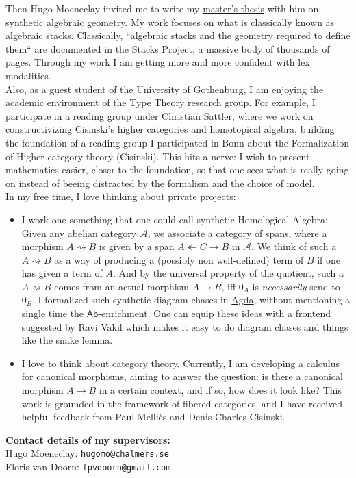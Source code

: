 \documentclass[12pt,headings=small,paper=A4,DIV=calc]{article}
\begin{document}
Then Hugo Moeneclay invited me to write my \href{https://github.com/timlichtnau/MasterThesis/blob/Main}{master's thesis} with him on synthetic algebraic geometry. My work focuses on what is classically known as algebraic stacks. Classically, ``algebraic stacks and the geometry required to define them`` are documented in the Stacks Project, a massive body of thousands of pages. Through my work I am getting more and more confident with lex modalities. \\
Also, as a guest student of the University of Gothenburg, I am enjoying the academic environment of the Type Theory research group. For example, I participate in a reading group under Christian Sattler, where we work on constructivizing Cisinski's higher categories and homotopical algebra, building the foundation of a reading group I participated in Bonn about the Formalization of Higher category theory (Cisinski). This hits a nerve: I wish to present mathematics easier, closer to the foundation, so that one sees what is really going on instead of beeing distracted by the formalism and the choice of model. \\
In my free time, I love thinking about private projects: 
\begin{itemize}
	\item I work one something that one could call synthetic Homological Algebra: Given any abelian category $\mathcal{A}$, we associate a category of spans, where a morphism $A \rightsquigarrow B$ is given by a span $A \twoheadleftarrow C \to B$ in $\mathcal{A}$. We think of such a $A \rightsquigarrow B$ as a way of producing a (possibly non well-defined) term of $B$ if one has given a term of $A$. And by the universal property of the quotient, such a $A \rightsquigarrow B$ comes from an actual morphism $A \to B$, iff $0_A$ is \emph{necessarily} send to $0_B$. I formalized such synthetic diagram chases in \href{https://github.com/timlichtnau/CarpetsOnAgda/blob/master/}{Agda}, without mentioning a single time the $\mathsf{Ab}$-enrichment. One can equip these ideas with a \href{https://www.3blue1brown.com/content/blog/exact-sequence-picturebook/PuzzlingThroughExactSequences.pdf}{frontend} suggested by Ravi Vakil which makes it easy to do diagram chases and things like the snake lemma. 
	\item  I love to think about category theory. Currently, I am developing a calculus for canonical morphisms, aiming to answer the question: is there a canonical morphism $A \to B$ in a certain context, and if so, how does it look like? This work is grounded in the framework of fibered categories, and I have received helpful feedback from Paul Melliès and Denis-Charles Cisinski. \\
\end{itemize}

\textbf{Contact details of my supervisors:} \\
Hugo Moeneclay: \texttt{hugomo@chalmers.se} \\
Floris van Doorn: \texttt{fpvdoorn@gmail.com}
\end{document}
